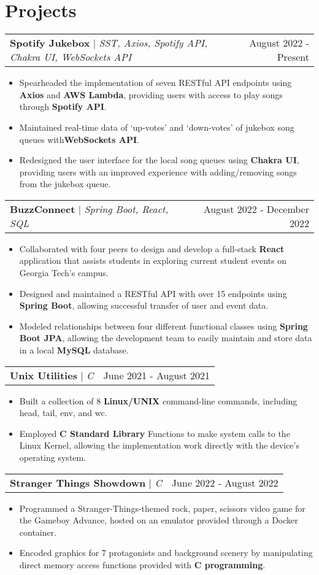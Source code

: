 \documentclass[letterpaper,11pt]{article}
\makeatletter
\newcommand{\resumeProjectHeading}[3]{
    \begin{tabular*}{0.97\textwidth}[t]{l@{\extracolsep{\fill}}r}
      \textbf{#1} $\vert$ \textit{#2}  & {#3}
    \end{tabular*}\vspace{-3pt}
}
\newcommand{\resumeItemListStart}{\begin{itemize}[noitemsep]\vspace{-4pt}}
\newcommand{\resumeItemListEnd}{\end{itemize}}
\makeatother
\begin{document}
\section{Projects}
    \resumeProjectHeading{Spotify Jukebox}{SST, Axios, Spotify API, Chakra UI, WebSockets API}{August 2022 - Present}
      \resumeItemListStart
        \item {Spearheaded the implementation of seven RESTful API endpoints using \textbf{Axios} and \textbf{AWS Lambda}, providing users with access to play songs through \textbf{Spotify API}.}
        \item {Maintained real-time data of `up-votes' and `down-votes' of jukebox song queues with\textbf{WebSockets API}.}
        \item {Redesigned the user interface for the local song queues using \textbf{Chakra UI}, providing users with an improved experience with adding/removing songs from the jukebox queue.}
      \resumeItemListEnd

    \resumeProjectHeading{BuzzConnect}{Spring Boot, React, SQL}{August 2022 - December 2022}
      \resumeItemListStart
        \item {Collaborated with four peers to design and develop a full-stack \textbf{React} application that assists students in exploring current student events on Georgia Tech's campus.}
        \item {Designed and maintained a RESTful API with over 15 endpoints using \textbf{Spring Boot}, allowing successful transfer of user and event data.}
        \item {Modeled relationships between four different functional classes using \textbf{Spring Boot JPA}, allowing the development team to easily maintain and store data in a local \textbf{MySQL} database.}
      \resumeItemListEnd

    \resumeProjectHeading{Unix Utilities}{C}{June 2021 - August 2021}
      \resumeItemListStart
        \item {Built a collection of 8 \textbf{Linux/UNIX} command-line commands, including head, tail, env, and wc.}
        \item {Employed \textbf{C Standard Library} Functions to make system calls to the Linux Kernel, allowing the implementation work directly with the device's operating system.}
      \resumeItemListEnd

    \resumeProjectHeading{Stranger Things Showdown}{C}{June 2022 - August 2022}
      \resumeItemListStart
        \item {Programmed a Stranger-Things-themed rock, paper, scissors video game for the Gameboy Advance, hosted on an emulator provided through a Docker container.}
        \item {Encoded graphics for 7 protagonists and background scenery by manipulating direct memory access functions provided with \textbf{C programming}.}
      \resumeItemListEnd
\end{document}
